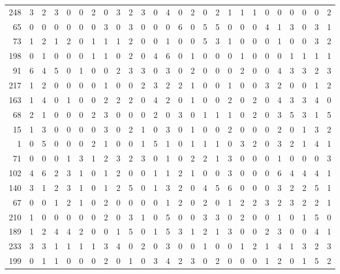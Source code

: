 \begin{longtable}{@{\extracolsep{\fill}}rccccccccccccccccccccccccc@{}}
248 & 3 & 2 & 3 & 0 & 0 & 2 & 0 & 3 & 2 & 3 & 0 & 4 & 0 & 2 & 0 & 2 & 1 & 1 & 1 & 0 & 0 & 0 & 0 & 0 & 2 \\
65 & 0 & 0 & 0 & 0 & 0 & 0 & 3 & 0 & 3 & 0 & 0 & 0 & 6 & 0 & 5 & 5 & 0 & 0 & 0 & 4 & 1 & 3 & 0 & 3 & 1 \\
73 & 1 & 2 & 1 & 2 & 0 & 1 & 1 & 1 & 2 & 0 & 0 & 1 & 0 & 0 & 5 & 3 & 1 & 0 & 0 & 0 & 1 & 0 & 0 & 3 & 2 \\
198 & 0 & 1 & 0 & 0 & 0 & 1 & 1 & 0 & 2 & 0 & 4 & 6 & 0 & 1 & 0 & 0 & 0 & 1 & 0 & 0 & 0 & 1 & 1 & 1 & 1 \\
91 & 6 & 4 & 5 & 0 & 1 & 0 & 0 & 2 & 3 & 3 & 0 & 3 & 0 & 2 & 0 & 0 & 0 & 2 & 0 & 0 & 4 & 3 & 3 & 2 & 3 \\
217 & 1 & 2 & 0 & 0 & 0 & 0 & 1 & 0 & 0 & 2 & 3 & 2 & 2 & 1 & 0 & 0 & 1 & 0 & 0 & 3 & 2 & 0 & 0 & 1 & 2 \\
163 & 1 & 4 & 0 & 1 & 0 & 0 & 2 & 2 & 2 & 0 & 4 & 2 & 0 & 1 & 0 & 0 & 2 & 0 & 2 & 0 & 4 & 3 & 3 & 4 & 0 \\
68 & 2 & 1 & 0 & 0 & 0 & 2 & 3 & 0 & 0 & 0 & 2 & 0 & 3 & 0 & 1 & 1 & 1 & 0 & 2 & 0 & 3 & 5 & 3 & 1 & 5 \\
15 & 1 & 3 & 0 & 0 & 0 & 0 & 3 & 0 & 2 & 1 & 0 & 3 & 0 & 1 & 0 & 0 & 2 & 0 & 0 & 0 & 2 & 0 & 1 & 3 & 2 \\
1 & 0 & 5 & 0 & 0 & 0 & 2 & 1 & 0 & 0 & 1 & 5 & 1 & 0 & 1 & 1 & 1 & 0 & 3 & 2 & 0 & 3 & 2 & 1 & 4 & 1 \\
71 & 0 & 0 & 0 & 1 & 3 & 1 & 2 & 3 & 2 & 3 & 0 & 1 & 0 & 2 & 2 & 1 & 3 & 0 & 0 & 0 & 1 & 0 & 0 & 0 & 3 \\
102 & 4 & 6 & 2 & 3 & 1 & 0 & 1 & 2 & 0 & 0 & 1 & 1 & 2 & 1 & 0 & 0 & 3 & 0 & 0 & 0 & 6 & 4 & 4 & 4 & 1 \\
140 & 3 & 1 & 2 & 3 & 1 & 0 & 1 & 2 & 5 & 0 & 1 & 3 & 2 & 0 & 4 & 5 & 6 & 0 & 0 & 0 & 3 & 2 & 2 & 5 & 1 \\
67 & 0 & 0 & 1 & 2 & 1 & 0 & 2 & 0 & 0 & 0 & 0 & 1 & 2 & 0 & 2 & 0 & 1 & 2 & 2 & 3 & 2 & 3 & 2 & 2 & 1 \\
210 & 1 & 0 & 0 & 0 & 0 & 0 & 2 & 0 & 3 & 1 & 0 & 5 & 0 & 0 & 3 & 3 & 0 & 2 & 0 & 0 & 1 & 0 & 1 & 5 & 0 \\
189 & 1 & 2 & 4 & 4 & 2 & 0 & 0 & 1 & 5 & 0 & 1 & 5 & 3 & 1 & 2 & 1 & 3 & 0 & 0 & 2 & 3 & 0 & 0 & 4 & 1 \\
233 & 3 & 3 & 1 & 1 & 1 & 1 & 3 & 4 & 0 & 2 & 0 & 3 & 0 & 0 & 1 & 0 & 0 & 1 & 2 & 1 & 4 & 1 & 3 & 2 & 3 \\
199 & 0 & 1 & 1 & 0 & 0 & 0 & 2 & 0 & 1 & 0 & 3 & 4 & 2 & 3 & 0 & 2 & 0 & 0 & 0 & 1 & 2 & 0 & 1 & 5 & 2 \\

\end{longtable}
